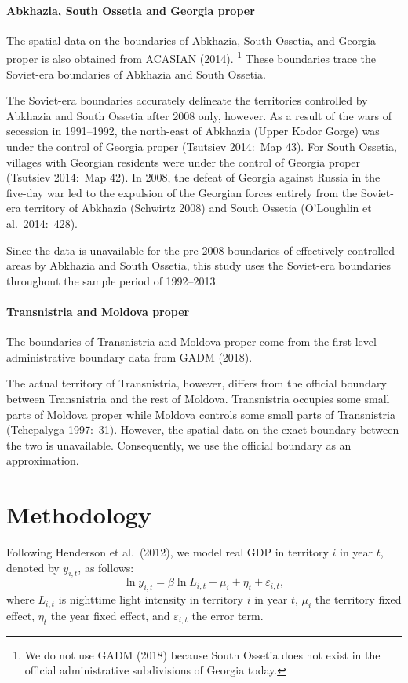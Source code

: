 \documentclass[12pt,a4paper]{article}%
\begin{document}
\paragraph{Abkhazia, South Ossetia and Georgia proper}  
The spatial data on the boundaries of Abkhazia, South Ossetia, and Georgia proper is also obtained from ACASIAN (2014).%
\footnote{
	We do not use GADM (2018) because South Ossetia does not exist in the official administrative subdivisions of Georgia today.
	} 
These boundaries trace the Soviet-era boundaries of Abkhazia and South Ossetia.

The Soviet-era boundaries accurately delineate the territories controlled by Abkhazia and South Ossetia after 2008 only, however. As a result of the wars of secession in 1991--1992, the north-east of Abkhazia (Upper Kodor Gorge) was under the control of Georgia proper (Tsutsiev 2014:\ Map 43). 
For South Ossetia, villages with Georgian residents were under the control of Georgia proper (Tsutsiev 2014:\ Map 42). 
In 2008, the defeat of Georgia against Russia in the five-day war led to the expulsion of the Georgian forces entirely from the Soviet-era territory of Abkhazia (Schwirtz 2008) and South Ossetia (O'Loughlin et al.\ 2014:\ 428).  

Since the data is unavailable for the pre-2008 boundaries of effectively controlled areas by Abkhazia and South Ossetia, this study uses the Soviet-era boundaries throughout the sample period of 1992--2013.

\paragraph{Transnistria and Moldova proper} 
The boundaries of Transnistria and Moldova proper come from the first-level administrative boundary data from GADM (2018). 

The actual territory of Transnistria, however, differs from the official boundary between Transnistria and the rest of Moldova. 
Transnistria occupies some small parts of Moldova proper while Moldova controls some small parts of Transnistria (Tchepalyga 1997:\ 31). 
However, the spatial data on the exact boundary between the two is unavailable. 
Consequently, we use the official boundary as an approximation.

\section{Methodology}\label{methodology}
Following Henderson et al.\ (2012), we model real GDP in territory $i$ in year $t$, denoted by $y_{i,t}$, as follows:
\begin{equation}\label{gdp}
\ln y_{i,t} = \beta \ln L_{i,t} + \mu_i + \eta_t + \varepsilon_{i,t},
\end{equation}
where $L_{i,t}$ is nighttime light intensity in territory $i$ in year $t$, $\mu_i$ the territory fixed effect, $\eta_t$ the year fixed effect, and $\varepsilon_{i,t}$ the error term.
\end{document}
